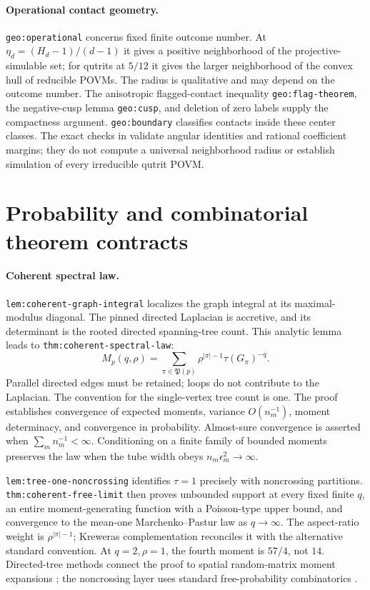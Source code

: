 \paragraph{Operational contact geometry.}
\texttt{geo:operational} concerns fixed finite outcome number. At
$\eta_d=(H_d-1)/(d-1)$ it gives a positive neighborhood of the
projective-simulable set; for qutrits at $5/12$ it gives the larger
neighborhood of the convex hull of reducible POVMs. The radius is
qualitative and may depend on the outcome number. The anisotropic
flagged-contact inequality \texttt{geo:flag-theorem}, the negative-cusp
lemma \texttt{geo:cusp}, and deletion of zero labels supply the compactness
argument. \texttt{geo:boundary} classifies contacts inside these center
classes. The exact checks in  validate angular
identities and rational coefficient margins; they do not compute a
universal neighborhood radius or establish simulation of every
irreducible qutrit POVM.

\section{Probability and combinatorial theorem contracts}

\paragraph{Coherent spectral law.}
\texttt{lem:coherent-graph-integral} localizes the graph integral at its
maximal-modulus diagonal. The pinned directed Laplacian is accretive,
and its determinant is the rooted directed spanning-tree count.
This analytic lemma leads to \texttt{thm:coherent-spectral-law}:
\[
 M_p(q,\rho)=\sum_{\pi\in\mathfrak P(p)}
       \rho^{|\pi|-1}\tau(G_\pi)^{-q}.
\]
Parallel directed edges must be retained; loops do not contribute to
the Laplacian. The convention for the single-vertex tree count is one.
The proof establishes convergence of expected moments, variance
$O(n_m^{-1})$, moment determinacy, and convergence in probability.
Almost-sure convergence is asserted when $\sum_m n_m^{-1}<\infty$.
Conditioning on a finite family of bounded moments preserves the law
when the tube width obeys $n_m\epsilon_m^2\to\infty$.

\texttt{lem:tree-one-noncrossing} identifies $\tau=1$ precisely with
noncrossing partitions. \texttt{thm:coherent-free-limit} then proves
unbounded support at every fixed finite $q$, an entire moment-generating
function with a Poisson-type upper bound, and convergence to the
mean-one Marchenko--Pastur law as $q\to\infty$. The aspect-ratio weight
is $\rho^{|\pi|-1}$; Kreweras complementation reconciles it with the
alternative standard convention. At $q=2,\rho=1$, the fourth moment is
$57/4$, not $14$. Directed-tree methods connect the proof to spatial
random-matrix moment expansions \citep{prob_bordenave2008}; the
noncrossing layer uses standard free-probability combinatorics
\citep{prob_nica_speicher2006}.

